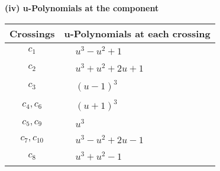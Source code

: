 \documentclass[1p]{elsarticle_modified}
\theoremstyle{definition}
\begin{document}
\newpage\renewcommand{\arraystretch}{1}
\flushleft \textbf{(iv) u-Polynomials at the component}\newline \\
\begin{tabular}{m{50pt}|m{274pt}}
Crossings & \hspace{64pt}u-Polynomials at each crossing \\
\hline $$\begin{aligned}c_{1}\end{aligned}$$&$\begin{aligned}
&u^3- u^2+1
\end{aligned}$\\
\hline $$\begin{aligned}c_{2}\end{aligned}$$&$\begin{aligned}
&u^3+u^2+2 u+1
\end{aligned}$\\
\hline $$\begin{aligned}c_{3}\end{aligned}$$&$\begin{aligned}
&(u-1)^3
\end{aligned}$\\
\hline $$\begin{aligned}c_{4},c_{6}\end{aligned}$$&$\begin{aligned}
&(u+1)^3
\end{aligned}$\\
\hline $$\begin{aligned}c_{5},c_{9}\end{aligned}$$&$\begin{aligned}
&u^3
\end{aligned}$\\
\hline $$\begin{aligned}c_{7},c_{10}\end{aligned}$$&$\begin{aligned}
&u^3- u^2+2 u-1
\end{aligned}$\\
\hline $$\begin{aligned}c_{8}\end{aligned}$$&$\begin{aligned}
&u^3+u^2-1
\end{aligned}$\\
\hline
\end{tabular}\\~\\
\newpage\renewcommand{\arraystretch}{1}
\end{document}
